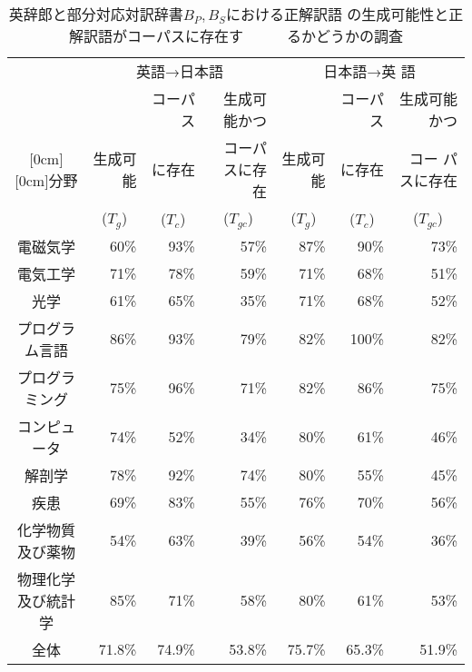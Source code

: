 \documentclass[japanese]{jnlp_1.3a}
\begin{document}
\begin{table}[t]
 \small
 \centering \caption{英辞郎と部分対応対訳辞書$B_P, B_S$における正解訳語
 の生成可能性と正解訳語がコーパスに存在す　　　るかどうかの調査}
 \label{tab:seiseika}
 \begin{tabular}{|c|r|r|r|r|r|r|}
  \hline
  & \multicolumn{3}{|c|}{英語→日本語} & \multicolumn{3}{|c|}{日本語→英
  語} \\
      \cline{2-7}
  & & コーパス & 生成可能かつ & & コーパス & 生成可能かつ\\
      \raisebox{0.5\normalbaselineskip}[0cm][0cm]{分野} 
& 生成可能 & に存在 & コーパスに存在 & 生成可能 & に存在 & コー
  パスに存在 \\
  & \multicolumn{1}{|c|}{($T_g$)} & \multicolumn{1}{|c|}{($T_c$)} & \multicolumn{1}{|c|}{($T_{gc}$)} & \multicolumn{1}{|c|}{($T_g$)} & \multicolumn{1}{|c|}{($T_c$)} & \multicolumn{1}{|c|}{($T_{gc}$)} \\
  \hline \hline
  電磁気学           & 60\% & 93\% & 57\% & 87\% &  90\% & 73\%  \\
  電気工学           & 71\% & 78\% & 59\% & 71\% &  68\% & 51\%  \\
  光学               & 61\% & 65\% & 35\% & 71\% &  68\% & 52\%  \\
  プログラム言語     & 86\% & 93\% & 79\% & 82\% & 100\% & 82\%  \\
  プログラミング     & 75\% & 96\% & 71\% & 82\% &  86\% & 75\%  \\
  コンピュータ       & 74\% & 52\% & 34\% & 80\% &  61\% & 46\%  \\
  解剖学             & 78\% & 92\% & 74\% & 80\% &  55\% & 45\%  \\
  疾患               & 69\% & 83\% & 55\% & 76\% &  70\% & 56\%  \\
  化学物質及び薬物   & 54\% & 63\% & 39\% & 56\% &  54\% & 36\%  \\
  物理化学及び統計学 & 85\% & 71\% & 58\% & 80\% &  61\% & 53\%  \\
  \hline
  全体               & 71.8\% & 74.9\% & 53.8\% & 75.7\% & 65.3\% & 51.9\%  \\
  \hline
 \end{tabular}
\end{table}
\end{document}
